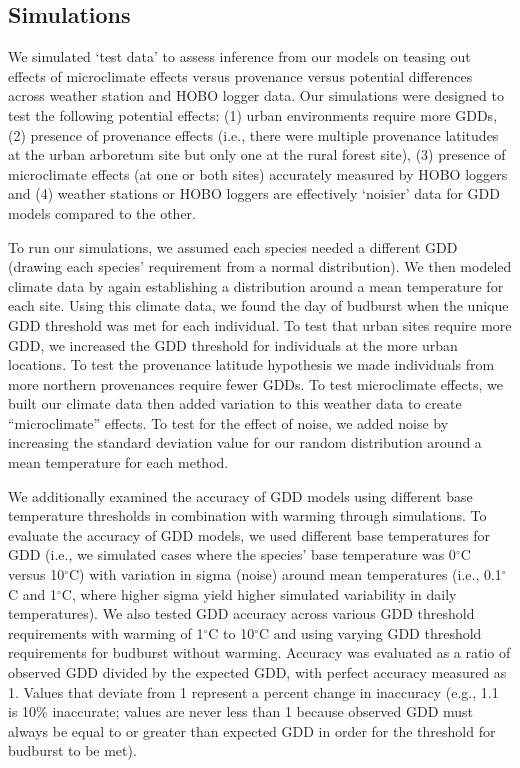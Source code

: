 \documentclass{article}\usepackage[]{graphicx}\usepackage[]{color}
\begin{document}
\subsection*{Simulations}
We simulated `test data' to assess inference from our models on teasing out effects of microclimate effects versus provenance versus potential differences across weather station and HOBO logger data. Our simulations were designed to test the following potential effects: (1) urban environments require more GDDs, (2) presence of provenance effects (i.e., there were multiple provenance latitudes at the urban arboretum site but only one at the rural forest site), (3) presence of microclimate effects (at one or both sites) accurately measured by HOBO loggers and (4) weather stations or HOBO loggers are effectively `noisier' data for GDD models compared to the other. 

To run our simulations, we assumed each species needed a different GDD (drawing each species' requirement from a normal distribution). We then modeled climate data by again establishing a distribution around a mean temperature for each site. Using this climate data, we found the day of budburst when the unique GDD threshold was met for each individual. To test that urban sites require more GDD, we increased the GDD threshold for individuals at the more urban locations. To test the provenance latitude hypothesis we made individuals from more northern provenances require fewer GDDs. To test microclimate effects, we built our climate data then added variation to this weather data to create ``microclimate'' effects.  To test for the effect of noise, we added noise by increasing the standard deviation value for our random distribution around a mean temperature for each method.

We additionally examined the accuracy of GDD models using different base temperature thresholds in combination with warming through simulations. To evaluate the accuracy of GDD models, we used different base temperatures for GDD (i.e., we simulated cases where the species' base temperature was 0$^{\circ}$C versus 10$^{\circ}$C) with variation in sigma (noise) around mean temperatures (i.e., 0.1$^{\circ}$C and 1$^{\circ}$C, where higher sigma yield higher simulated variability in daily temperatures). We also tested GDD accuracy across various GDD threshold requirements with warming of 1$^{\circ}$C to 10$^{\circ}$C and using varying GDD threshold requirements for budburst without warming. Accuracy was evaluated as a ratio of observed GDD divided by the expected GDD, with perfect accuracy measured as 1. Values that deviate from 1 represent a percent change in inaccuracy (e.g., 1.1 is 10\% inaccurate; values are never less than 1 because observed GDD must always be equal to or greater than expected GDD in order for the threshold for budburst to be met).
\end{document}
